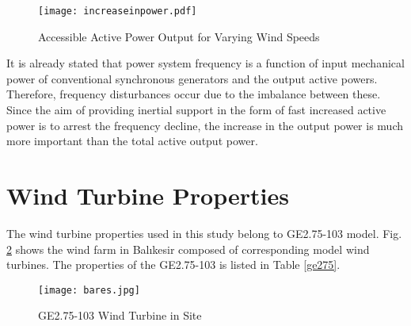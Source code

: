 \begin{figure}[h!]
	\centering
	\texttt{[image: increaseinpower.pdf]}
	\caption{Accessible Active Power Output for Varying Wind Speeds}
	\label{increase_active_power}
\end{figure}
It is already stated that power system frequency is a function of input mechanical power of conventional synchronous generators and the output active powers. Therefore, frequency disturbances occur due to the imbalance between these. Since the aim of providing inertial support in the form of fast increased active power is to arrest the frequency decline, the increase in the output power is much more important than the total active output power. 
\section{Wind Turbine Properties}
The wind turbine properties used in this study belong to GE2.75-103 model. Fig. \ref{bares} shows the wind farm in Balıkesir composed of corresponding model wind turbines. The properties of the GE2.75-103 is listed in Table \ref{ge275}.
\begin{figure}[h]
	\centering
	\texttt{[image: bares.jpg]}
	\caption{GE2.75-103 Wind Turbine in Site}
	\label{bares}
\end{figure}

